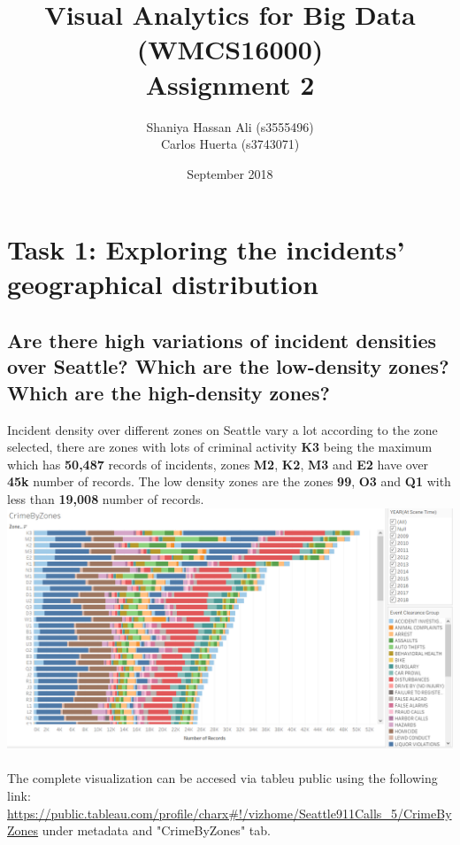 \documentclass{article}
\title{Visual Analytics for Big Data (WMCS16000)\\
\large{Assignment 2}}
\author{Shaniya Hassan Ali (s3555496)
\\Carlos Huerta (s3743071) }
\date{September 2018}
\begin{document}
\maketitle

\section{Task	1:	Exploring	the	incidents’	geographical	distribution}
\subsection{Are there high variations of incident densities over Seattle? Which are the low-density zones? Which are the high-density	zones?}
        Incident density over different zones on Seattle vary a lot according to the zone selected, there are zones with lots of criminal activity \textbf{K3} being the maximum which has \textbf{50,487} records of incidents, zones \textbf{M2}, \textbf{K2}, \textbf{M3} and \textbf{E2} have over \textbf{45k} number of records. The low density zones are the zones \textbf{99}, \textbf{O3} and \textbf{Q1} with less than \textbf{19,008} number of records.
        \\
        \includegraphics[width=\textwidth]{VisualAnalytics/Assignment2/images/CrimesByZone.PNG}
        \\\\
        The complete visualization can be accesed via tableu public using the following link:
        \url{https://public.tableau.com/profile/charx#!/vizhome/Seattle911Calls_5/CrimeByZones} under metadata and "CrimeByZones" tab.
\end{document}
